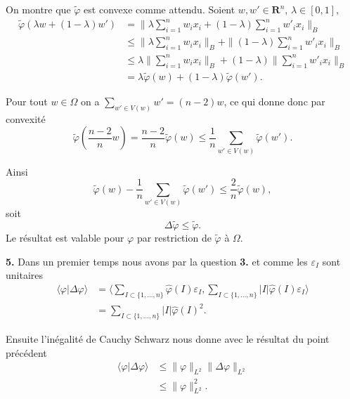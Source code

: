 \documentclass[12pt]{article}
\newcommand{\R}{\mathbf{R}}
\begin{document}
On montre que $\tilde{\varphi}$ est convexe comme attendu. Soient $w, w' \in \R^{n}$, $\lambda \in [0, 1]$,
\begin{align*}
        \tilde{\varphi}(\lambda w + (1-\lambda)w') &= \|\lambda\sum_{i=1}^{n} w_{i}x_{i} + (1-\lambda)\sum_{i=1}^{n} w'_{i}x_{i}\|_{B} \\
                                                   &\le \|\lambda\sum_{i=1}^{n} w_{i}x_{i}\|_{B} + \|(1-\lambda)\sum_{i=1}^{n} w'_{i}x_{i}\|_{B} \\
                                                   &\le\lambda\|\sum_{i=1}^{n} w_{i}x_{i}\|_{B} + (1-\lambda)\|\sum_{i=1}^{n} w'_{i}x_{i}\|_{B} \\
                                                   &= \lambda\tilde{\varphi}(w) + (1-\lambda)\tilde{\varphi}(w')
.\end{align*}

Pour tout $w \in \Omega$ on a $\sum_{w'\in V(w)}w' = (n-2)w$, ce qui donne donc par convexité \[
        \tilde{\varphi}(\frac{n-2}{n}w) = \frac{n-2}{n}\tilde{\varphi}(w) \le \frac{1}{n}\sum_{w'\in V(w)}\tilde{\varphi}(w')
.\] 

Ainsi \[
        \tilde{\varphi}(w) - \frac{1}{n}\sum_{w'\in V(w)}\tilde{\varphi}(w') \le \frac{2}{n}\tilde{\varphi}(w)
,\] soit \[
\Delta\tilde{\varphi} \le \tilde{\varphi}
.\] Le résultat est valable pour $\varphi$ par restriction de  $\tilde\varphi$ à $\Omega$. 

\medskip

\textbf{5.} Dans un premier temps nous avons par la question \textbf{3.} et comme les $\varepsilon_{I}$ sont unitaires
\begin{align*}
\langle \varphi | \Delta\varphi \rangle &= \langle \sum_{I \subset \{1, \ldots, n\}} \hat{\varphi}(I)\varepsilon_{I}, \sum_{I \subset \{1, \ldots, n\}}|I| \hat{\varphi}(I)\varepsilon_{I} \rangle \\
                                                &= \sum_{I \subset \{1, \ldots, n\}}|I|\hat{\varphi}(I)^{2} 
.\end{align*}

Ensuite l'inégalité de Cauchy Schwarz nous donne avec le résultat du point précédent 
\begin{align*}
        \langle \varphi | \Delta\varphi \rangle &\le \|\varphi\|_{L^{2}}\|\Delta\varphi\|_{L^{2}} \\
                                                &\le \|\varphi\|^{2}_{L^{2}}
.\end{align*}
\end{document}
